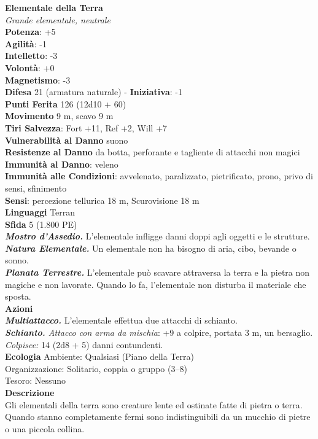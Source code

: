 \begin{multicols}{2}
\medskip\textbf{Elementale della Terra}\\
\emph{Grande elementale, neutrale}\\
\textbf{Potenza}: +5\\
\textbf{Agilità}: -1\\
\textbf{Intelletto}: -3\\
\textbf{Volontà}: +0\\
\textbf{Magnetismo}: -3\\
\textbf{Difesa} 21 (armatura naturale) - \textbf{Iniziativa}: -1\\
\textbf{Punti Ferita} 126 (12d10 + 60)\\
\textbf{Movimento} 9 m, scavo 9 m\\
\textbf{Tiri Salvezza}: Fort +11, Ref +2, Will +7\\
\textbf{Vulnerabilità al Danno} suono\\
\textbf{Resistenze al Danno} da botta, perforante e tagliente di attacchi non magici\\
\textbf{Immunità al Danno}: veleno\\
\textbf{Immunità alle Condizioni}: avvelenato, paralizzato, pietrificato, prono, privo di sensi, sfinimento\\
\textbf{Sensi}: percezione tellurica 18 m, Scurovisione 18 m\\
\textbf{Linguaggi} Terran\\
\textbf{Sfida} 5 (1.800 PE)\smallskip\\
\emph{\textbf{Mostro d'Assedio.}} L'elementale infligge danni doppi agli oggetti e le strutture.\\
\emph{\textbf{Natura Elementale.}} Un elementale non ha bisogno di aria, cibo, bevande o sonno.\\
\emph{\textbf{Planata Terrestre.}} L'elementale può scavare attraversa la terra e la pietra non magiche e non lavorate. Quando lo fa, l'elementale non disturba il materiale che sposta.\\
\smallskip\textbf{Azioni}\\
\emph{\textbf{Multiattacco.}} L'elementale effettua due attacchi di schianto.\\
\emph{\textbf{Schianto.} Attacco con arma da mischia}: +9 a colpire, portata 3 m, un bersaglio.\\
\emph{Colpisce:} 14 (2d8 + 5) danni contundenti.\\
\textbf{Ecologia}
Ambiente: Qualsiasi (Piano della Terra)\\
Organizzazione: Solitario, coppia o gruppo (3–8)\\
Tesoro: Nessuno\\
\textbf{Descrizione}\\
Gli elementali della terra sono creature lente ed ostinate fatte di pietra o terra. Quando stanno completamente fermi sono indistinguibili da un mucchio di pietre o una piccola collina.\\


\end{multicols}
